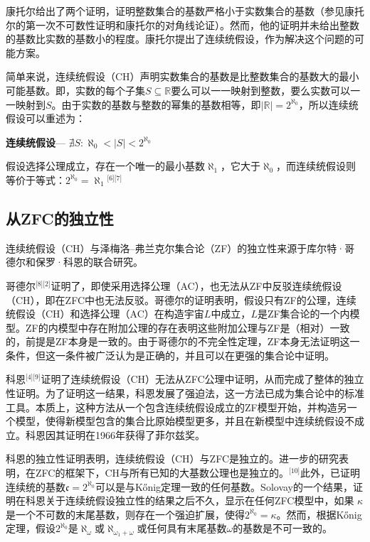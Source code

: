 康托尔给出了两个证明，证明整数集合的基数严格小于实数集合的基数（参见康托尔的第一次不可数性证明和康托尔的对角线论证）。然而，他的证明并未给出整数的基数比实数的基数小的程度。康托尔提出了连续统假设，作为解决这个问题的可能方案。

简单来说，连续统假设（CH）声明实数集合的基数是比整数集合的基数大的最小可能基数。即，实数的每个子集\( S \subseteq \mathbb{R} \)要么可以一一映射到整数，要么实数可以一一映射到\( S \)。由于实数的基数与整数的幂集的基数相等，即\( |\mathbb{R}| = 2^{\aleph_0} \)，所以连续统假设可以重述为：

\textbf{连续统假设}— \(\nexists S : \aleph_0 < |S| < 2^{\aleph_0}\)

假设选择公理成立，存在一个唯一的最小基数\( \aleph_1 \)，它大于\( \aleph_0 \)，而连续统假设则等价于等式：\(2^{\aleph_0} = \aleph_1\)\(^\text{[6][7]}\)
\subsection{从ZFC的独立性} 
连续统假设（CH）与泽梅洛–弗兰克尔集合论（ZF）的独立性来源于库尔特·哥德尔和保罗·科恩的联合研究。

哥德尔\(^\text{[8][2]}\)证明了，即使采用选择公理（AC），也无法从ZF中反驳连续统假设（CH），即在ZFC中也无法反驳。哥德尔的证明表明，假设只有ZF的公理，连续统假设（CH）和选择公理（AC）在构造宇宙\( L \)中成立，\( L \)是ZF集合论的一个内模型。ZF的内模型中存在附加公理的存在表明这些附加公理与ZF是（相对）一致的，前提是ZF本身是一致的。由于哥德尔的不完全性定理，ZF本身无法证明这一条件，但这一条件被广泛认为是正确的，并且可以在更强的集合论中证明。

科恩\(^\text{[4][9]}\)证明了连续统假设（CH）无法从ZFC公理中证明，从而完成了整体的独立性证明。为了证明这一结果，科恩发展了强迫法，这一方法已成为集合论中的标准工具。本质上，这种方法从一个包含连续统假设成立的ZF模型开始，并构造另一个模型，使得新模型包含的集合比原始模型更多，并且在新模型中连续统假设不成立。科恩因其证明在1966年获得了菲尔兹奖。

科恩的独立性证明表明，连续统假设（CH）与ZFC是独立的。进一步的研究表明，在ZFC的框架下，CH与所有已知的大基数公理也是独立的。\(^\text{[10]}\)此外，已证明连续统的基数\( \mathfrak{c} = 2^{\aleph_0} \)可以是与Kőnig定理一致的任何基数。Solovay的一个结果，证明在科恩关于连续统假设独立性的结果之后不久，显示在任何ZFC模型中，如果 \( \kappa \)是一个不可数的末尾基数，则存在一个强迫扩展，使得\( 2^{\aleph_0} = \kappa \)。然而，根据Kőnig定理，假设\( 2^{\aleph_0} \)是\( \aleph_\omega \)或\( \aleph_{\omega_1 + \omega} \)或任何具有末尾基数\( \omega \)的基数是不可一致的。

